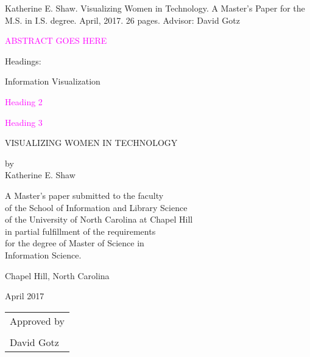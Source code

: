 \documentclass{article}
\newcommand{\bigmargins}{\vspace*{0.5in}}
\newcommand{\mytitle}{Visualizing Women in Technology}
\begin{document}
\thispagestyle{empty}
\singlespace
\noindent Katherine E. Shaw. \mytitle. A Master's Paper for the M.S. in I.S. degree. April, 2017. 26 pages. Advisor: David Gotz

\vspace{0.2in} %

\noindent \textcolor{magenta}{ABSTRACT GOES HERE} %

\vspace{1in} %

\doublespace
\noindent Headings:

Information Visualization

\textcolor{magenta}{Heading 2}

\textcolor{magenta}{Heading 3}


\clearpage


\bigmargins
\thispagestyle{empty}
\begin{center}
\MakeUppercase{\mytitle}

\vspace{1in} %
{\singlespace by\\Katherine E. Shaw

}

\vspace{1in} %
{\singlespace
  A Master's paper submitted to the faculty\\
  of the School of Information and Library Science\\
  of the University of North Carolina at Chapel Hill\\
  in partial fulfillment of the requirements\\
  for the degree of Master of Science in\\
  Information Science.

}

\vspace{1in} %
Chapel Hill, North Carolina

April 2017

\vspace{1in} %
\hfill\begin{tabular}{@{}p{3.25in}@{}}
Approved by \\

\\ \hline
David Gotz
\end{tabular}

\end{center}
\clearpage
\end{document}
